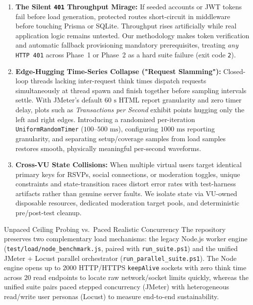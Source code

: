 \documentclass[11pt,letterpaper]{article}
\begin{document}
\begin{enumerate}
  \item \textbf{The Silent \texttt{401} Throughput Mirage:} If seeded accounts or JWT tokens fail before load generation, protected routes short-circuit in middleware before touching Prisma or SQLite. Throughput rises artificially while real application logic remains untested. Our methodology makes token verification and automatic fallback provisioning mandatory prerequisites, treating \emph{any} \texttt{HTTP 401} across Phase~1 or Phase~2 as a hard suite failure (exit code \texttt{2}).
  \item \textbf{Edge-Hugging Time-Series Collapse ("Request Slamming"):} Closed-loop threads lacking inter-request think times dispatch requests simultaneously at thread spawn and finish together before sampling intervals settle. With JMeter's default $60\text{ s}$ HTML report granularity and zero timer delay, plots such as \emph{Transactions per Second} exhibit points hugging only the left and right edges. Introducing a randomized per-iteration \texttt{UniformRandomTimer} ($100\text{--}500\text{ ms}$), configuring $1000\text{ ms}$ reporting granularity, and separating setup/coverage samples from load samples restores smooth, physically meaningful per-second waveforms.
  \item \textbf{Cross-VU State Collisions:} When multiple virtual users target identical primary keys for RSVPs, social connections, or moderation toggles, unique constraints and state-transition races distort error rates with test-harness artifacts rather than genuine server faults. We isolate state via VU-owned disposable resources, dedicated moderation target pools, and deterministic pre/post-test cleanup.
\end{enumerate}

\begin{calloutbox}[TealSignal]{Unpaced Ceiling Probing vs.\ Paced Realistic Concurrency}
The repository preserves two complementary load mechanisms: the legacy Node.js worker engine (\texttt{test/load/node\_benchmark.js}, paired with \texttt{run\_suite.ps1}) and the unified JMeter + Locust parallel orchestrator (\texttt{run\_parallel\_suite.ps1}). The Node engine opens up to $2000$ HTTP/HTTPS \texttt{keepAlive} sockets with zero think time across $20$ read endpoints to locate raw network/socket limits quickly, whereas the unified suite pairs paced stepped concurrency (JMeter) with heterogeneous read/write user personas (Locust) to measure end-to-end sustainability.
\end{calloutbox}
\end{document}
